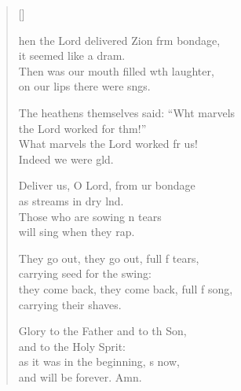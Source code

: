 \settowidth{\versewidth}{they come back, they come back, full of song, *}
\begin{verse}[\versewidth]
  \begin{patverse}
hen the Lord delivered Zion frm bondage,\Med\\
it seemed like a dram.\\
Then was our mouth filled w\pointup{\i}th laughter,\Med\\
on our lips there were sngs.

The heathens themselves said: “Wht marvels\Med\\
the Lord worked for thm!”\\
What marvels the Lord worked fr us!\Med\\
Indeed we were gld.

Deliver us, O Lord, from ur bondage\Med\\
as streams in dry lnd.\\
Those who are sowing \pointup{\i}n tears\Med\\
will sing when they rap.

They go out, they go out, full f tears,\Med\\
carrying seed for the swing:\\
they come back, they come back, full f song,\Med\\
carrying their shaves.

Glory to the Father and to th Son,\Med\\
and to the Holy Sprit:\\
as it was in the beginning, \pointup{\i}s now,\Med\\
and will be forever. Amn. 
  \end{patverse}
\end{verse}
